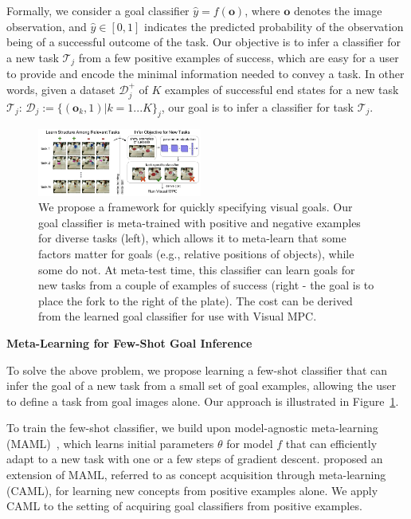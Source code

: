 \newcommand{\task}{\mathcal{T}}
\newcommand{\data}{\mathcal{D}}
\newcommand{\obs}{\mathbf{o}}
\newcommand{\out}{y}
\newcommand{\posdata}{\data^+}
\newcommand{\testdata}{\data^\text{test}}
\newcommand{\loss}{\mathcal{L}}

Formally, we consider a goal classifier $\hat{\out} = f(\obs)$, where $\obs$ denotes the image observation, and $\hat{\out} \in [0,1]$ indicates the predicted probability of the observation being of a successful outcome of the task. Our objective is to infer a classifier for a new task $\task_j$ from a few positive examples of success, which are easy for a user to provide and encode the minimal information needed to convey a task. In other words, given a dataset $\posdata_j$ of $K$ examples of successful end states for a new task $\task_j$: $\data_j:=\{(\obs_k, 1) | k = 1...K\}_j$, our goal is to infer a classifier for task $\task_j$.

\begin{figure}
    \centering
    \includegraphics[width=0.48\textwidth]{images_cls/cls_fig.jpeg}
    \caption{\small We propose a framework for quickly specifying visual goals. Our goal classifier is meta-trained with positive and negative examples for diverse tasks (left), which allows it to meta-learn that some factors matter for goals (e.g., relative positions of objects), while some do not. At meta-test time, this classifier can learn goals for new tasks from a couple of examples of success (right - the goal is to place the fork to the right of the plate). The cost can be derived from the learned goal classifier for use with Visual MPC.}
    \label{fig:cls_fig}
    \vspace{-0.3cm}
\end{figure}

\noindent \textbf{Meta-Learning for Few-Shot Goal Inference}

To solve the above problem, we propose learning a few-shot classifier that can infer the goal of a new task from a small set of goal examples, allowing the user to define a task from goal images alone. Our approach is illustrated in Figure~\ref{fig:cls_fig}.

To train the few-shot classifier, we build upon model-agnostic meta-learning (MAML)~\cite{maml}, which learns initial parameters $\theta$ for model $f$ that can efficiently adapt to a new task with one or a few steps of gradient descent. \cite{caml} proposed an extension of MAML, referred to as concept acquisition through meta-learning (CAML), for learning new concepts from positive examples alone. We apply CAML to the setting of acquiring goal classifiers from positive examples.

